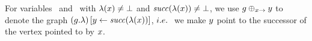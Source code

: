 \begin{graphop}[$\graph\addVarAsSuccOf{\xvar}{\yvar}$]
  For variables \xvar\ and \yvar\ with $\lambda(x)\neq\bot$
  and ${\it succ}(\lambda(x))\neq\bot$,
  we use $\graph\addVarAsSuccOf{\xvar}{\yvar}$ to denote the graph
  $\left(g.\lambda\right)\left[y\leftarrow{\it succ}(\lambda(x))\right]$,
  $i.e.\ $ we make $y$ point to the successor of the vertex %
  pointed to by $x$.
\end{graphop}
%

